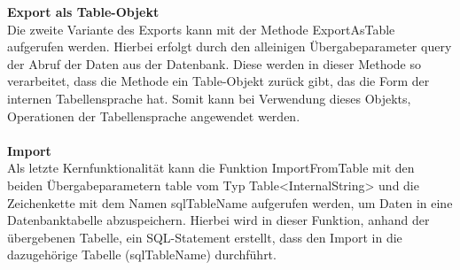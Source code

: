 \textbf{Export als Table-Objekt}\\
Die zweite Variante des Exports kann mit der Methode {\frqq}ExportAsTable{\flqq} aufgerufen werden. Hierbei erfolgt durch den alleinigen Übergabeparameter {\frqq}query{\flqq} der Abruf der Daten aus der Datenbank. Diese werden in dieser Methode so verarbeitet, dass die Methode ein Table-Objekt zurück gibt, das die Form der internen Tabellensprache hat. Somit kann bei Verwendung dieses Objekts, Operationen der Tabellensprache angewendet werden.\\\\
\textbf{Import}\\
Als letzte Kernfunktionalität kann die Funktion {\frqq}ImportFromTable{\flqq} mit den beiden Übergabeparametern table vom Typ Table<InternalString> und die Zeichenkette mit dem Namen {\frqq}sqlTableName{\flqq} aufgerufen werden, um Daten in eine Datenbanktabelle abzuspeichern. Hierbei wird in dieser Funktion, anhand der übergebenen Tabelle, ein SQL-Statement erstellt, dass den Import in die dazugehörige Tabelle (sqlTableName) durchführt.

